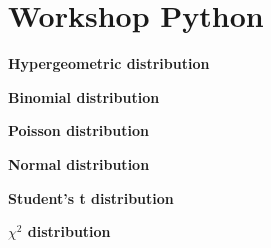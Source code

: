 
\section{Workshop Python} %
\label{sec:workshop02p}

\begin{exercise}
\label{ex:hyper_p}

\textbf{Hypergeometric distribution}





\end{exercise}

\begin{exercise}
\label{ex:binom_p}

\textbf{Binomial distribution}



\end{exercise}

\begin{exercise}
\label{ex:poiss_p}

\textbf{Poisson distribution}




\end{exercise}

\begin{exercise}
\label{ex:norm_p}

\textbf{Normal distribution}




\end{exercise}

\begin{exercise}
\label{ex:student_p}

\textbf{Student's t distribution}



\end{exercise}

\begin{exercise}
\label{ex:chisq_p}

\textbf{\texorpdfstring{$\chi^2$}{chi-squared} distribution}




\end{exercise}

